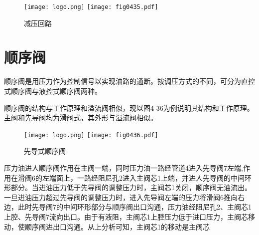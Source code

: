 \begin{figure}[!hbt]
\centering
\ifOpenSource
\texttt{[image: logo.png]}
\else
\texttt{[image: fig0435.pdf]}
\fi
\caption{减压回路}
\label{fig:fig0435}
\end{figure}

\section{顺序阀}

顺序阀是用压力作为控制信号以实现油路的通断。按调压方式的不同，可分为直控式顺序阀与液控式顺序阀两种。

顺序阀的结构与工作原理和溢流阀相似，现以图4-36为例说明其结构和工作原理。主阀和先导阀均为滑阀式，其外形与溢流阀相似。

\begin{figure}[!hbt]
\centering
\ifOpenSource
\texttt{[image: logo.png]}
\else
\texttt{[image: fig0436.pdf]}
\fi
\caption{先导式顺序阀}
\label{fig:fig0436}
\end{figure}

压力油进人顺序阀作用在主阀一端，同时压力油一路经管道4进入先导阀7左端,作用在滑阀6的左端面上，一路经阻尼孔2进入主阀芯1上端，并进人先导阀的中间环形部分。当进油压力低于先导阀的调整压力时，主阀芯1关闭，顺序阀无油流出。一旦进油压力超过先导阀的调整压力时，进入先导阀左端的压力将滑阀6推向右边，此时先导阀7的中间环形部分与顺序阀出口沟通，压力油经阻尼孔2、主阀芯1上腔、先导阀7流向出口。由于有液阻，主阀芯1上腔压力低于进口压力，主阀芯移动，使顺序阀进出口沟通。从上分析可知，主阀芯1的移动是主阀芯

